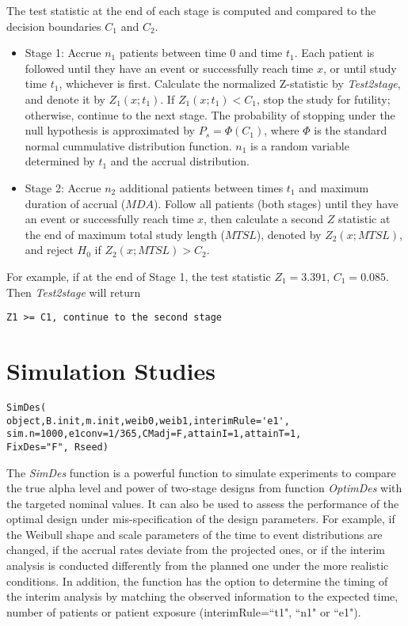 \documentclass[12pt]{article}
\begin{document}
The test statistic at the end of each stage is computed and compared to the decision boundaries $C_1$ and $C_2$.

\begin{itemize}
\item
Stage 1: Accrue $n_1$ patients between time $0$ and time $t_1$. Each patient is followed
until they have an event or successfully reach time $x$, or until study time $t_1$, whichever is
first. Calculate the normalized Z-statistic by {\it Test2stage}, and denote it by $Z_1(x;t_1)$. If
$Z_1(x;t_1)<C_1$, stop the study for futility; otherwise, continue to the next stage.  The probability of
stopping under the null hypothesis is approximated by $P_s=\Phi(C_1)$, where $\Phi$ is the standard normal
cummulative distribution function.  $n_1$ is  a random variable determined by $t_1$ and the accrual
distribution.
\item
Stage 2: Accrue $n_2$ additional patients between times $t_1$ and maximum duration of accrual ($MDA$). Follow all
patients (both stages) until they have an event or successfully reach time $x$, then calculate a
second $Z$ statistic at the end of maximum total study length ($MTSL$), denoted by $Z_2(x;MTSL)$, and
reject $H_0$ if $Z_2(x;MTSL)>C_2$.
\end{itemize}

For example, if at the end of Stage 1, the test statistic $Z_1=3.391$, $C_1=0.085$. Then {\it Test2stage} will return
\begin{center}
\begin{verbatim}
Z1 >= C1, continue to the second stage
\end{verbatim}
\end{center}


\section{Simulation Studies}
\label{SimDes}

\begin{center}
\begin{verbatim}
SimDes(
object,B.init,m.init,weib0,weib1,interimRule='e1',
sim.n=1000,e1conv=1/365,CMadj=F,attainI=1,attainT=1,
FixDes="F", Rseed)
\end{verbatim}
\end{center}

The {\it SimDes} function is a powerful function to simulate experiments to compare the true alpha
level and power of two-stage designs from function {\it OptimDes} with the targeted nominal values.
It can also be used to assess the performance of the optimal design under mis-specification of the
design parameters. For example, if the Weibull shape and scale parameters of the time to event
distributions are changed, if the accrual rates deviate from the projected ones, or if the interim
analysis is conducted differently from the planned one under the more realistic conditions. In
addition, the function has the option to determine the timing of the interim analysis by matching
the observed information to the expected time, number of patients or patient exposure
(interimRule=``t1", ``n1" or ``e1").
\end{document}
